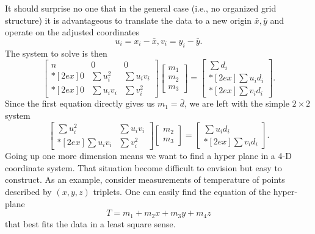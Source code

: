 It should surprise no one that in the general case (i.e., no organized grid structure) it is advantageous to translate 
the data to a new origin $\bar{x},\bar{y}$   and operate on the adjusted coordinates
\begin{equation}
u_i = x_i - \bar{x}, v_i = y_i - \bar{y}	 .
\end{equation}
The system to solve is then
\begin{equation}
\left [ \begin{array}{ccc}
n & 0 & 0 \\*[2ex]
0 & \displaystyle \sum u^2_i & \displaystyle \sum u_iv_i \\*[2ex]
0 & \displaystyle \sum u_i v_i & \displaystyle \sum v^2_i
\end{array} \right ] 
\left [ \begin{array}{c}
m_1\\ m_2\\ m_3 \end{array} \right ] = 
\left[ \begin{array}{c} \displaystyle \sum d_i \\*[2ex] \displaystyle \sum u_i d_i \\*[2ex] \displaystyle \sum v_i d_i \end{array} \right ].
\end{equation}	 
Since the first equation directly gives us $m_1 = \bar{d}$, we are left with the simple $2\times 2$ system
\begin{equation}
\left[ \begin{array}{cc}
\displaystyle \sum u^2_i & \displaystyle \sum u_i v_i \\*[2ex]
\displaystyle \sum u_i  v_i & \displaystyle \sum v^2_i
\end{array} \right ]
\left [ \begin{array}{c}
m_2\\ m_3 \end{array} \right ] = 
\left [ \begin{array}{c}
\displaystyle \sum u_i d_i \\*[2ex]
\displaystyle \sum v_i d_i 
\end{array}
\right ].
\end{equation}
	Going up one more dimension means we want to find a hyper plane in a 4-D coordinate 
system.  That situation become difficult to envision but easy to construct.  As an example, consider 
measurements of temperature of points described by  $(x,y,z)$ triplets.  One can easily find the 
equation of the hyper-plane
\begin{equation}
	T = m_1 + m_2 x + m_3 y + m_4 z
\end{equation}
that best fits the data in a least square sense.

